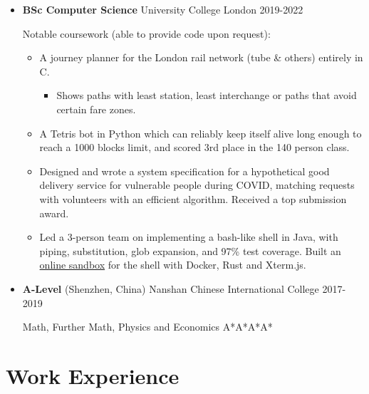  \begin{itemize}
    \item \textbf{BSc Computer Science} \dashdiv{} University College London \dashdiv{} 2019-2022

      Notable coursework (able to provide code upon request):

      \begin{itemize}
        \item A journey planner for the\tflicon{} London rail network (tube \& others) entirely in C.

        \begin{itemize}
          \item Shows paths with least station, least interchange or paths that avoid certain fare zones.
        \end{itemize}

        \item A Tetris bot in Python which can reliably keep itself alive long enough to reach a 1000 blocks limit, and scored 3rd place in the 140 person class.

        \item Designed and wrote a system specification for a hypothetical good delivery service for vulnerable people during COVID, matching requests with volunteers with an efficient algorithm. Received a top submission award.

        \item Led a 3-person team on implementing a bash-like shell in Java, with piping, substitution, glob expansion, and 97\% test coverage. Built an \href{https://jsh-sandbox.maowtm.org}{\color{link}online sandbox} for the shell with Docker, Rust and Xterm.js.
      \end{itemize}

    \item \textbf{A-Level} \dashdiv{} (Shenzhen, China) Nanshan Chinese International College \dashdiv{} 2017-2019

      Math, Further Math, Physics and Economics \dashdiv{} A*A*A*A*
  \end{itemize}

  \section{Work Experience}

